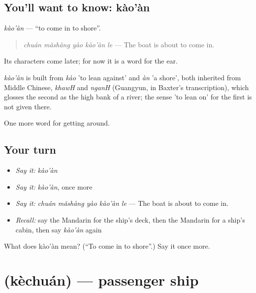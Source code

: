 \subsection*{You'll want to know: kào'àn}
\emph{kào'àn} — \textquotedblleft{}to come in to shore\textquotedblright{}.

\begin{quote}
\emph{chuán mǎshàng yào kào'àn le} — The boat is about to come in.
\end{quote}

Its characters come later; for now it is a word for the ear.

\begin{cousinweb}
\emph{kào'àn} is built from \emph{kào} 'to lean against' and \emph{àn} 'a shore', both inherited from Middle Chinese, \emph{khawH} and \emph{nganH} (Guangyun, in Baxter's transcription), which glosses the second as the high bank of a river; the sense 'to lean on' for the first is not given there.
\end{cousinweb}

\begin{grammarlens}[title={What you've built}]
One more word for getting around.
\end{grammarlens}

\subsection*{Your turn}
\begin{itemize}
\raggedright
  \item \emph{Say it:} \emph{kào'àn}
  \item \emph{Say it:} \emph{kào'àn}, once more
  \item \emph{Say it:} \emph{chuán mǎshàng yào kào'àn le} — The boat is about to come in.
  \item \emph{Recall:} say the Mandarin for the ship's deck, then the Mandarin for a ship's cabin, then say \emph{kào'àn} again
\end{itemize}

\begin{tcolorbox}[breakable,colback=teal!4,colframe=teal!35!black,title={Before you move on}]
What does kào'àn mean? (\textquotedblleft{}To come in to shore\textquotedblright{}.) Say it once more.
\end{tcolorbox}
\section[\texorpdfstring{\zh{客船} (kèchuán)}{客船 (kèchuán)}]{ (kèchuán) — passenger ship}

